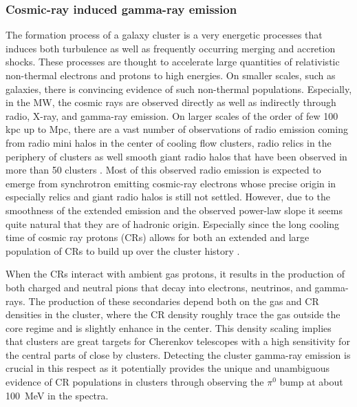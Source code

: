 \documentclass[10pt,aps,pra,reprint,amsmath,amsfonts,amssymb,showpacs]{revtex4-1}
\begin{document}
\subsubsection{Cosmic-ray induced gamma-ray emission}
\label{sect:CRs}
The formation process of a galaxy cluster is a very energetic
processes that induces both turbulence as well as frequently occurring
merging and accretion shocks. These processes are thought to
accelerate large quantities of relativistic non-thermal electrons and
protons to high energies. On smaller scales, such as galaxies, there
is convincing evidence of such non-thermal populations. Especially, in
the MW, the cosmic rays are observed directly as well as indirectly
through radio, X-ray, and gamma-ray emission. On larger scales of the
order of few 100 kpc up to Mpc, there are a vast number of
observations of radio emission coming from radio mini halos in the
center of cooling flow clusters, radio relics in the periphery of
clusters \cite{2004rcfg.proc..335K} as well smooth giant radio halos
that have been observed in more than 50 clusters
\cite{2003ASPC..301..143F,2008SSRv..134...93F}. Most of this observed
radio emission is expected to emerge from synchrotron emitting
cosmic-ray electrons whose precise origin in especially relics and
giant radio halos is still not settled. However, due to the smoothness
of the extended emission and the observed power-law slope it seems
quite natural that they are of hadronic origin. Especially since the
long cooling time of cosmic ray protons (CRs) allows for both an
extended and large population of CRs to build up over the cluster
history \cite{1997ApJ...487..529B}.

When the CRs interact with ambient gas protons, it results in the
production of both charged and neutral pions that decay into
electrons, neutrinos, and gamma-rays. The production of these
secondaries depend both on the gas and CR densities in the cluster,
where the CR density roughly trace the gas outside the core regime and
is slightly enhance in the center. This density scaling implies that
clusters are great targets for Cherenkov telescopes with a high
sensitivity for the central parts of close by clusters. Detecting the
cluster gamma-ray emission is crucial in this respect as it
potentially provides the unique and unambiguous evidence of CR
populations in clusters through observing the $\pi^0$ bump at about
100~MeV in the spectra. 
\end{document}
